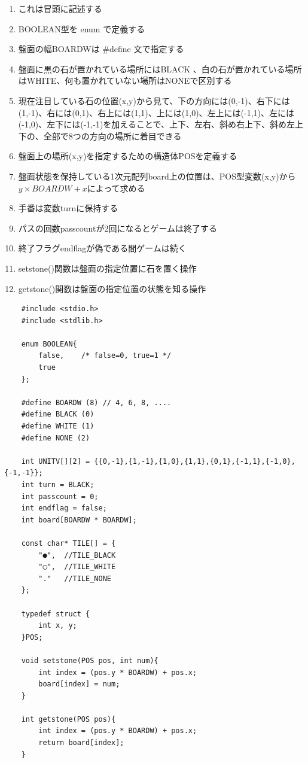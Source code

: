 \documentclass[uplatex,a4paper,11pt,oneside,openany]{jsbook}
\begin{document}
\begin{enumerate}
	\item これは冒頭に記述する
	\item BOOLEAN型を enum で定義する
	\item 盤面の幅BOARDWは \#define 文で指定する
	\item 盤面に黒の石が置かれている場所にはBLACK 、白の石が置かれている場所はWHITE、何も置かれていない場所はNONEで区別する
	\item 現在注目している石の位置(x,y)から見て、下の方向には(0,-1)、右下には(1,-1)、右には(0,1)、右上には(1,1)、上には(1,0)、左上には(-1,1)、左には(-1,0)、左下には(-1,-1)を加えることで、上下、左右、斜め右上下、斜め左上下の、全部で8つの方向の場所に着目できる
	\item 盤面上の場所(x,y)を指定するための構造体POSを定義する
	\item 盤面状態を保持している1次元配列board上の位置は、POS型変数(x,y)から\\$y \times BOARDW +x$によって求める
	\item 手番は変数turnに保持する
	\item パスの回数passcountが2回になるとゲームは終了する
	\item 終了フラグendflagが偽である間ゲームは続く
	\item setstone()関数は盤面の指定位置に石を置く操作
	\item getstone()関数は盤面の指定位置の状態を知る操作
\end{enumerate}

\begin{lstlisting}
	#include <stdio.h>
	#include <stdlib.h>
	
	enum BOOLEAN{
		false,    /* false=0, true=1 */
		true
	};
	
	#define BOARDW (8) // 4, 6, 8, ....
	#define BLACK (0)
	#define WHITE (1)
	#define NONE (2)
	
	int UNITV[][2] = {{0,-1},{1,-1},{1,0},{1,1},{0,1},{-1,1},{-1,0},{-1,-1}};
	int turn = BLACK;
	int passcount = 0;
	int endflag = false;
	int board[BOARDW * BOARDW];
	
	const char* TILE[] = {
		"●",  //TILE_BLACK
		"◯",  //TILE_WHITE
		"."   //TILE_NONE
	};
	
	typedef struct {
		int x, y;
	}POS;
	
	void setstone(POS pos, int num){
		int index = (pos.y * BOARDW) + pos.x;
		board[index] = num;
	}
	
	int getstone(POS pos){
		int index = (pos.y * BOARDW) + pos.x;
		return board[index];
	}
\end{lstlisting}
\end{document}
